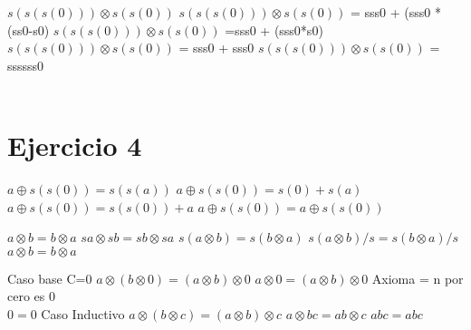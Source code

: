\documentclass[14pt]{article}
\begin{document}
{$s(s(s(0)))\otimes s(s(0))$} \newline
{$s(s(s(0)))\otimes s(s(0))$} = sss0 + (sss0 * (ss0-s0) \newline
{$s(s(s(0)))\otimes s(s(0))$} =sss0 + (sss0*s0) \newline
{$s(s(s(0)))\otimes s(s(0))$} = sss0 + sss0 \newline
{$s(s(s(0)))\otimes s(s(0))$} = ssssss0 \newline
\\
\\
\section{Ejercicio 4}


$a\oplus s(s(0))=s(s(a))$ \newline
$a\oplus s(s(0))=s(0) +s(a)$ \newline
$a\oplus s(s(0))=s(s(0)) +a$ \newline
$a\oplus s(s(0))=a\oplus s(s(0))$ \newline
\newline

$a \otimes b = b \otimes a$ \newline
$sa \otimes sb = sb \otimes sa$ \newline
$s(a \otimes b) = s(b \otimes a)$ \newline
$s(a \otimes b)/s = s(b \otimes a)/s$ \newline
$a \otimes b = b \otimes a$ \newline
\newline


Caso base C=0 \newline
$a \otimes (b \otimes 0)=(a\otimes b)\otimes 0$ \newline
$a \otimes 0=(a\otimes b)\otimes 0$ \newline
Axioma = n por cero es 0
\\
$0=0$ \newline
\newline
Caso Inductivo \newline
$a \otimes (b \otimes c)=(a\otimes b)\otimes c$ \newline
$a \otimes bc=ab\otimes c$ \newline
$abc=abc$ \newline
\newline
\end{document}
